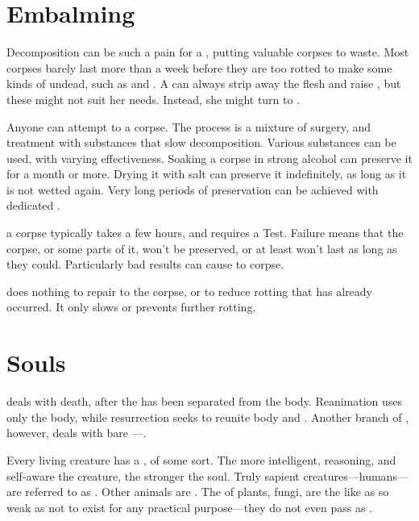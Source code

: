 \section{Embalming}

Decomposition can be such a pain for a , putting valuable corpses to waste.
Most corpses barely last more than a week before they are too rotted to make some kinds of undead, such as  and .
A  can always strip away the flesh and raise , but these might not suit her needs.
Instead, she might turn to {\embalming}.

Anyone can attempt to {\embalm} a corpse.
The process is a mixture of surgery, and treatment with substances that slow decomposition.
Various substances can be used, with varying effectiveness.
Soaking a corpse in strong alcohol can preserve it for a month or more.
Drying it with salt can preserve it indefinitely, as long as it is not wetted again.
Very long periods of preservation can be achieved with dedicated .

\capital{\embalming} a corpse typically takes a few hours, and requires a  Test.
Failure means that the corpse, or some parts of it, won't be preserved, or at least won't last as long as they could.
Particularly bad results can cause {\damage} to corpse.

\capital{\embalming} does nothing to repair {\damage} to the corpse, or to reduce rotting that has already occurred.
It only slows or prevents further rotting.

\section{Souls}

 deals with death, after the {\soul} has been separated from the body.
Reanimation uses only the body, while resurrection seeks to reunite body and {\soul}.
Another branch of , however, deals with bare {\souls}---{\ghosts}.

Every living creature has a {\soul}, of some sort.
The more intelligent, reasoning, and self-aware the creature, the stronger the soul.
Truly sapient creatures---humans---are referred to as {\strongsouled}.
Other animals are {\weaksouled}.
The {\souls} of plants, fungi, are the like as so weak as not to exist for any practical purpose---they do not even pass as {\weaksouled}.

